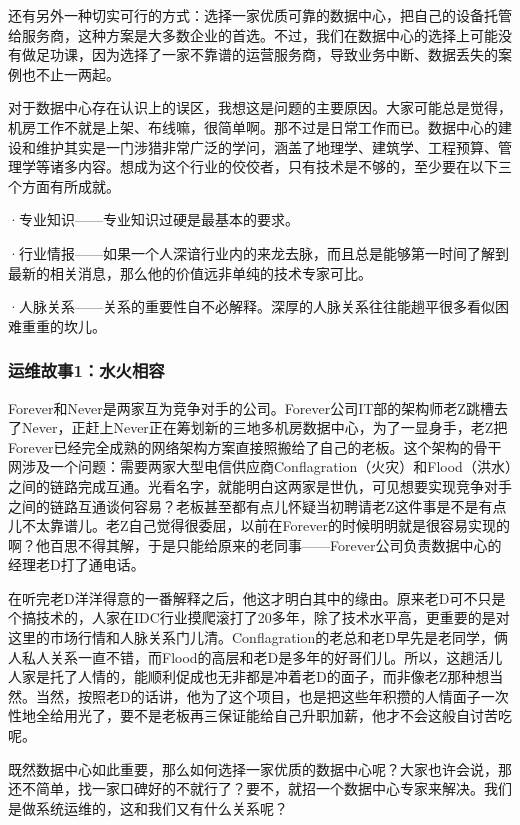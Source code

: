 \documentclass[12pt,UTF8]{ctexbook}
\begin{document}
还有另外一种切实可行的方式：选择一家优质可靠的数据中心，把自己的设备托管给服务商，这种方案是大多数企业的首选。不过，我们在数据中心的选择上可能没有做足功课，因为选择了一家不靠谱的运营服务商，导致业务中断、数据丢失的案例也不止一两起。

对于数据中心存在认识上的误区，我想这是问题的主要原因。大家可能总是觉得，机房工作不就是上架、布线嘛，很简单啊。那不过是日常工作而已。数据中心的建设和维护其实是一门涉猎非常广泛的学问，涵盖了地理学、建筑学、工程预算、管理学等诸多内容。想成为这个行业的佼佼者，只有技术是不够的，至少要在以下三个方面有所成就。

·专业知识——专业知识过硬是最基本的要求。

·行业情报——如果一个人深谙行业内的来龙去脉，而且总是能够第一时间了解到最新的相关消息，那么他的价值远非单纯的技术专家可比。

·人脉关系——关系的重要性自不必解释。深厚的人脉关系往往能趟平很多看似困难重重的坎儿。

\subsubsection{运维故事1：水火相容}

Forever和Never是两家互为竞争对手的公司。Forever公司IT部的架构师老Z跳槽去了Never，正赶上Never正在筹划新的三地多机房数据中心，为了一显身手，老Z把Forever已经完全成熟的网络架构方案直接照搬给了自己的老板。这个架构的骨干网涉及一个问题：需要两家大型电信供应商Conflagration（火灾）和Flood（洪水）之间的链路完成互通。光看名字，就能明白这两家是世仇，可见想要实现竞争对手之间的链路互通谈何容易？老板甚至都有点儿怀疑当初聘请老Z这件事是不是有点儿不太靠谱儿。老Z自己觉得很委屈，以前在Forever的时候明明就是很容易实现的啊？他百思不得其解，于是只能给原来的老同事——Forever公司负责数据中心的经理老D打了通电话。

在听完老D洋洋得意的一番解释之后，他这才明白其中的缘由。原来老D可不只是个搞技术的，人家在IDC行业摸爬滚打了20多年，除了技术水平高，更重要的是对这里的市场行情和人脉关系门儿清。Conflagration的老总和老D早先是老同学，俩人私人关系一直不错，而Flood的高层和老D是多年的好哥们儿。所以，这趟活儿人家是托了人情的，能顺利促成也无非都是冲着老D的面子，而非像老Z那种想当然。当然，按照老D的话讲，他为了这个项目，也是把这些年积攒的人情面子一次性地全给用光了，要不是老板再三保证能给自己升职加薪，他才不会这般自讨苦吃呢。

既然数据中心如此重要，那么如何选择一家优质的数据中心呢？大家也许会说，那还不简单，找一家口碑好的不就行了？要不，就招一个数据中心专家来解决。我们是做系统运维的，这和我们又有什么关系呢？
\end{document}
